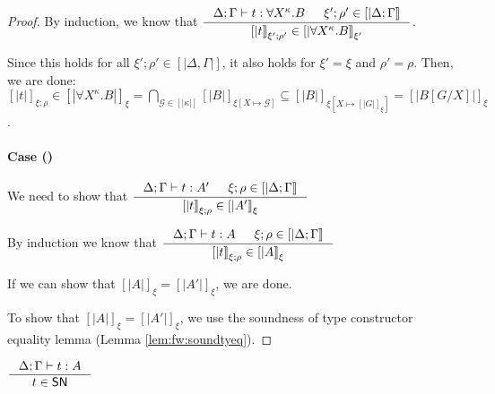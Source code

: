 \begin{proof}
By induction, we know that
$ \inference
        { \Delta;\Gamma |- t : \forall X^\kappa.B
        & \xi';\rho'\in[|\Delta;\Gamma|] }
        {[|t|]_{\xi';\rho'} \in [|\forall X^\kappa.B|]_{\xi'}} $.

Since this holds for all $\xi';\rho' \in [|\Delta,\Gamma|]$,
it also holds for $\xi'=\xi$ and $\rho'=\rho$. Then, we are done:
$ [|t|]_{\xi;\rho} \in [|\forall X^\kappa.B|]_{\xi}
        = \bigcap_{\mathcal{G}\in[|\kappa|]} [|B|]_{\xi[X\mapsto\mathcal{G}]}
        \subseteq [|B|]_{\xi[X\mapsto[|G|]_\xi]} = [|B[G/X]|]_\xi $.

\paragraph{Case ()}
We need to show that
$ \inference{\Delta;\Gamma |- t : A' & \xi;\rho\in[|\Delta;\Gamma|]}
        {[|t|]_{\xi;\rho} \in [|A'|]_\xi} $

By induction we know that 
$ \inference{\Delta;\Gamma |- t : A & \xi;\rho\in[|\Delta;\Gamma|]}
        {[|t|]_{\xi;\rho} \in [|A|]_\xi} $

If we can show that $[|A|]_\xi = [|A'|]_\xi$, we are done.

To show that $[|A|]_\xi = [|A'|]_\xi$,
we use the soundness of type constructor equality lemma
(Lemma \ref{lem:fw:soundtyeq}).
\end{proof}

\begin{corollary}
        $\inference{\Delta;\Gamma |- t : A}{t \in \SN}$
\end{corollary}

